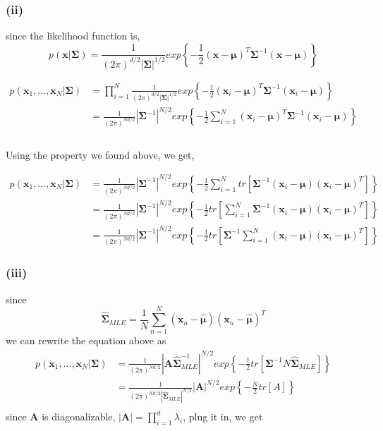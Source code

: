 \documentclass[11pt]{article}
\begin{document}
\subsubsection*{(ii)}

since the likelihood function is, $$p(\pmb{x}|\pmb{\Sigma})=\frac{1}{(2\pi)^{d/2}|\pmb{\Sigma}|^{1/2}}exp\left\{-\frac{1}{2}(\pmb{x}-\pmb{\mu})^T\pmb{\Sigma}^{-1}(\pmb{x}-\pmb{\mu})\right\}$$

\begin{equation}
\begin{split}
p(\pmb{x}_1,...,\pmb{x}_N|\pmb{\Sigma})&=\prod_{i=1}^{N}\frac{1}{(2\pi)^{d/2}|\pmb{\Sigma}|^{1/2}}exp\left\{-\frac{1}{2}(\pmb{x}_i-\pmb{\mu})^T\pmb{\Sigma}^{-1}(\pmb{x}_i-\pmb{\mu})\right\}\\
&=\frac{1}{(2\pi)^{Nd/2}}|\pmb{\Sigma}^{-1}|^{N/2}exp\left\{-\frac{1}{2}\sum_{i=1}^{N}(\pmb{x}_i-\pmb{\mu})^T\pmb{\Sigma}^{-1}(\pmb{x}_i-\pmb{\mu})\right\}\\
\end{split}
\end{equation}\\

Using the property we found above, we get,

\begin{equation}
\begin{split}
p(\pmb{x}_1,...,\pmb{x}_N|\pmb{\Sigma})&=\frac{1}{(2\pi)^{Nd/2}}|\pmb{\Sigma}^{-1}|^{N/2}exp\left\{-\frac{1}{2}\sum_{i=1}^{N}tr\left[\pmb{\Sigma}^{-1}(\pmb{x}_i-\pmb{\mu})(\pmb{x}_i-\pmb{\mu})^T\right]\right\}\\
&=\frac{1}{(2\pi)^{Nd/2}}|\pmb{\Sigma}^{-1}|^{N/2}exp\left\{-\frac{1}{2}tr\left[\sum_{i=1}^{N}\pmb{\Sigma}^{-1}(\pmb{x}_i-\pmb{\mu})(\pmb{x}_i-\pmb{\mu})^T\right]\right\}\\
&=\frac{1}{(2\pi)^{Nd/2}}|\pmb{\Sigma}^{-1}|^{N/2}exp\left\{-\frac{1}{2}tr\left[\pmb{\Sigma}^{-1}\sum_{i=1}^{N}(\pmb{x}_i-\pmb{\mu})(\pmb{x}_i-\pmb{\mu})^T\right]\right\}
\end{split}
\end{equation}

\subsubsection*{(iii)}
since 
$$\hat{\pmb{\Sigma}}_{MLE} = \frac{1}{N}\sum_{n=1}^{N}(\pmb{x}_n-\hat{\pmb{\mu}})(\pmb{x}_n-\hat{\pmb{\mu}})^T$$
we can rewrite the equation above as\\
\begin{equation}
\begin{split}
p(\pmb{x}_1,...,\pmb{x}_N|\pmb{\Sigma})&=\frac{1}{(2\pi)^{Nd/2}}|\pmb{A}\hat{\pmb{\Sigma}}_{MLE}^{-1}|^{N/2}exp\left\{-\frac{1}{2}tr\left[\pmb{\Sigma}^{-1}N\hat{\pmb{\Sigma}}_{MLE}\right]\right\}\\
&=\frac{1}{(2\pi)^{Nd/2}|\hat{\pmb{\Sigma}}_{MLE}|^{N/2}}|\pmb{A}|^{N/2}exp\left\{-\frac{N}{2}tr\left[A\right]\right\}\\
\end{split}
\end{equation}
since $\pmb{A}$ is diagonalizable, $|\pmb{A}| = \prod_{i=1}^{d}\lambda_i$, plug it in, we get
\end{document}

